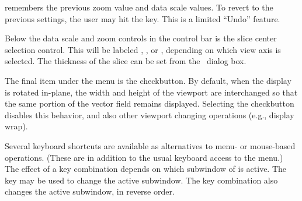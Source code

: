  remembers the previous zoom value and data scale values.
To revert to the previous settings, the user may hit the  key.
This is a limited ``Undo'' feature.

Below the data scale and zoom controls in the control bar is the slice
center selection control.  This will be
labeled , , or , depending on
which view axis is selected.  The thickness of the slice can be set
from the \ dialog box.

The final item under the  menu is the
 checkbutton.  By default, when the
display is rotated in-plane, the width and height of the viewport are
interchanged so that the same portion of the vector field remains
displayed.  Selecting the  checkbutton
disables this behavior, and also other viewport changing operations
(e.g., display wrap).

Several keyboard shortcuts are available as alternatives to menu- or
mouse-based operations.  (These are in addition to the usual keyboard
access to the menu.)  The effect of a key combination depends on which
subwindow of  is active.  The  key may be used to
change the active subwindow.  The  key combination also
changes the active subwindow, in reverse order.

